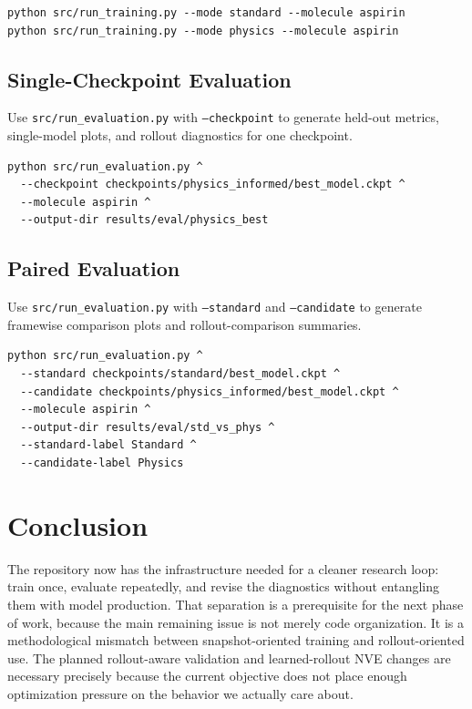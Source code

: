 \documentclass[11pt]{article}
\begin{document}
\begin{verbatim}
python src/run_training.py --mode standard --molecule aspirin
python src/run_training.py --mode physics --molecule aspirin
\end{verbatim}

\subsection{Single-Checkpoint Evaluation}

Use \texttt{src/run\_evaluation.py} with \texttt{--checkpoint} to generate held-out metrics, single-model plots, and rollout diagnostics for one checkpoint.

\begin{verbatim}
python src/run_evaluation.py ^
  --checkpoint checkpoints/physics_informed/best_model.ckpt ^
  --molecule aspirin ^
  --output-dir results/eval/physics_best
\end{verbatim}

\subsection{Paired Evaluation}

Use \texttt{src/run\_evaluation.py} with \texttt{--standard} and \texttt{--candidate} to generate framewise comparison plots and rollout-comparison summaries.

\begin{verbatim}
python src/run_evaluation.py ^
  --standard checkpoints/standard/best_model.ckpt ^
  --candidate checkpoints/physics_informed/best_model.ckpt ^
  --molecule aspirin ^
  --output-dir results/eval/std_vs_phys ^
  --standard-label Standard ^
  --candidate-label Physics
\end{verbatim}

\section{Conclusion}

The repository now has the infrastructure needed for a cleaner research loop: train once, evaluate repeatedly, and revise the diagnostics without entangling them with model production. That separation is a prerequisite for the next phase of work, because the main remaining issue is not merely code organization. It is a methodological mismatch between snapshot-oriented training and rollout-oriented use. The planned rollout-aware validation and learned-rollout NVE changes are necessary precisely because the current objective does not place enough optimization pressure on the behavior we actually care about.
\end{document}
